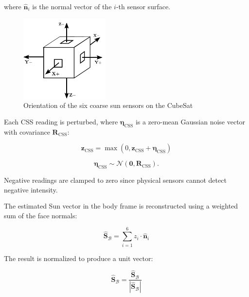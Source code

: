 \noindent where $\hat{\mathbf{n}}_i$ is the normal vector of the $i$-th sensor surface.

\begin{figure}[H]
    \centering
    \includegraphics[width=0.4\textwidth]{figures/modelling/CSS.pdf}
    \caption{Orientation of the six coarse sun sensors on the CubeSat}
    \label{fig:CSS}
\end{figure}


\noindent Each CSS reading is perturbed, where \(\boldsymbol{\eta}_{\text{CSS}}\) is a zero-mean 
Gaussian noise vector with covariance \(\mathbf{R}_{\text{CSS}}\):

\begin{equation}
    \mathbf{z}_{\text{CSS}} = \max\left( 0, \mathbf{z}_{\text{CSS}} + \boldsymbol{\eta}_{\text{CSS}} \right)
\end{equation}

\begin{equation}
    \boldsymbol{\eta}_{\text{CSS}} \sim \mathcal{N}(\mathbf{0}, \mathbf{R}_{\text{CSS}}).
\end{equation}

\noindent Negative readings are clamped to zero since physical sensors cannot detect negative intensity.
\vspace{0.5cm}

\noindent The estimated Sun vector in the body frame is reconstructed using a weighted sum of the face normals:

\begin{equation}
    \hat{\mathbf{S}}_\mathcal{B} = \sum_{i=1}^{6} z_i \cdot \hat{\mathbf{n}}_i
\end{equation}

\noindent The result is normalized to produce a unit vector:

\begin{equation}
    \hat{\mathbf{S}}_\mathcal{B} = \frac{\hat{\mathbf{S}}_\mathcal{B}}{|\hat{\mathbf{S}}_\mathcal{B}|}
\end{equation}

